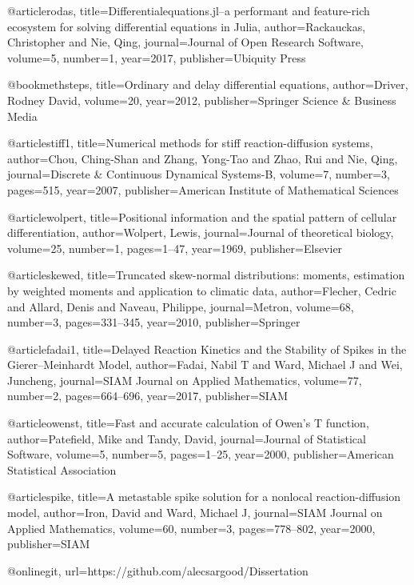 @article{rodas,
  title={Differentialequations.jl--a performant and feature-rich ecosystem for solving differential equations in Julia},
  author={Rackauckas, Christopher and Nie, Qing},
  journal={Journal of Open Research Software},
  volume={5},
  number={1},
  year={2017},
  publisher={Ubiquity Press}
}


@book{methsteps,
  title={Ordinary and delay differential equations},
  author={Driver, Rodney David},
  volume={20},
  year={2012},
  publisher={Springer Science \& Business Media}
}


@article{stiff1,
  title={Numerical methods for stiff reaction-diffusion systems},
  author={Chou, Ching-Shan and Zhang, Yong-Tao and Zhao, Rui and Nie, Qing},
  journal={Discrete \& Continuous Dynamical Systems-B},
  volume={7},
  number={3},
  pages={515},
  year={2007},
  publisher={American Institute of Mathematical Sciences}
}

@article{wolpert,
  title={Positional information and the spatial pattern of cellular differentiation},
  author={Wolpert, Lewis},
  journal={Journal of theoretical biology},
  volume={25},
  number={1},
  pages={1--47},
  year={1969},
  publisher={Elsevier}
}


@article{skewed,
  title={Truncated skew-normal distributions: moments, estimation by weighted moments and application to climatic data},
  author={Flecher, Cedric and Allard, Denis and Naveau, Philippe},
  journal={Metron},
  volume={68},
  number={3},
  pages={331--345},
  year={2010},
  publisher={Springer}
}

@article{fadai1,
  title={Delayed Reaction Kinetics and the Stability of Spikes in the Gierer--Meinhardt Model},
  author={Fadai, Nabil T and Ward, Michael J and Wei, Juncheng},
  journal={SIAM Journal on Applied Mathematics},
  volume={77},
  number={2},
  pages={664--696},
  year={2017},
  publisher={SIAM}
}


@article{owenst,
  title={Fast and accurate calculation of Owen’s T function},
  author={Patefield, Mike and Tandy, David},
  journal={Journal of Statistical Software},
  volume={5},
  number={5},
  pages={1--25},
  year={2000},
  publisher={American Statistical Association}
}

@article{spike,
  title={A metastable spike solution for a nonlocal reaction-diffusion model},
  author={Iron, David and Ward, Michael J},
  journal={SIAM Journal on Applied Mathematics},
  volume={60},
  number={3},
  pages={778--802},
  year={2000},
  publisher={SIAM}
}

@online{git,
url={https://github.com/alecsargood/Dissertation}
}


